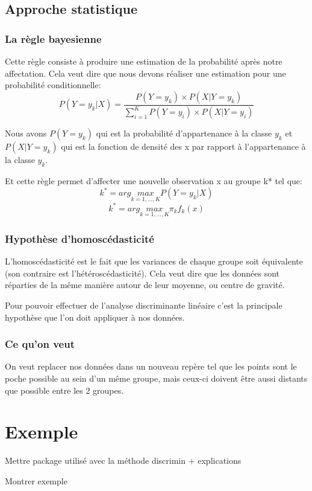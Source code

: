 \documentclass[b]{beamer}
\begin{document}
	\subsection{Approche statistique}
	\begin{frame}
	\frametitle{La règle bayesienne}
	Cette règle consiste à produire une estimation de la probabilité après notre affectation.
	Cela veut dire que nous devons réaliser une estimation pour une probabilité conditionnelle:
	\[
	P(Y = y_k | X) = \frac{P(Y = y_k) \times P(X| Y = y_k)}{\sum_{i=1}^{K} P(Y = y_i)\times P(X|Y = y_i)}
	\]
	
	Nous avons $P(Y = y_k)$ qui est la probabilité d'appartenance à la classe $y_k$ et $P(X|Y = y_k)$ qui est la fonction de densité des x par rapport à l'appartenance à la classe $y_k$.
	
	Et cette règle permet d'affecter une nouvelle observation x au groupe k* tel que:
	\[
		k^* = arg \underset{k=1,...,K}{max} P(Y = y_k | X)
	\] 
	\[
		k^*= arg \underset{k=1,...,K}{max} \pi_kf_k(x)
	\]	
	\end{frame}
	\begin{frame}
		\frametitle{Hypothèse d'homoscédasticité}
		L'homoscédasticité est le fait que les variances de chaque groupe soit équivalente (son contraire est l'hétéroscédasticité). Cela veut dire que les données sont réparties de la même manière autour de leur moyenne, ou centre de gravité. 
		
		Pour pouvoir effectuer de l'analyse discriminante linéaire c'est la principale hypothèse que l'on doit appliquer à nos données.
	\end{frame}
	
	\begin{frame}
		\frametitle{Ce qu'on veut}
		On veut replacer nos données dans un nouveau repère tel que les points sont le poche possible au sein d'un même groupe, mais ceux-ci doivent être aussi distants que possible entre les 2 groupes.
	\end{frame}
	\section{Exemple}
	\begin{frame}
		Mettre package utilisé avec la méthode discrimin + explications
	\end{frame}
	\begin{frame}
		Montrer exemple
	\end{frame}
\end{document}
